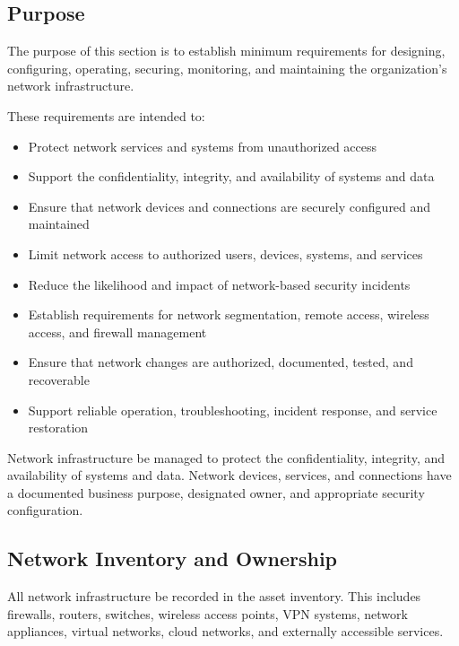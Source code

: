\subsection{Purpose}

The purpose of this section is to establish minimum requirements for designing, configuring, operating, securing, monitoring, and maintaining the organization's network infrastructure.

These requirements are intended to:

\begin{itemize}
    \item Protect network services and systems from unauthorized access
    \item Support the confidentiality, integrity, and availability of systems and data
    \item Ensure that network devices and connections are securely configured and maintained
    \item Limit network access to authorized users, devices, systems, and services
    \item Reduce the likelihood and impact of network-based security incidents
    \item Establish requirements for network segmentation, remote access, wireless access, and firewall management
    \item Ensure that network changes are authorized, documented, tested, and recoverable
    \item Support reliable operation, troubleshooting, incident response, and service restoration
\end{itemize}

Network infrastructure \must{} be managed to protect the confidentiality, integrity, and availability of systems and data. Network devices, services, and connections \must{} have a documented business purpose, designated owner, and appropriate security configuration.

\subsection{Network Inventory and Ownership}

All network infrastructure \must{} be recorded in the asset inventory. This includes firewalls, routers, switches, wireless access points, VPN systems, network appliances, virtual networks, cloud networks, and externally accessible services.

